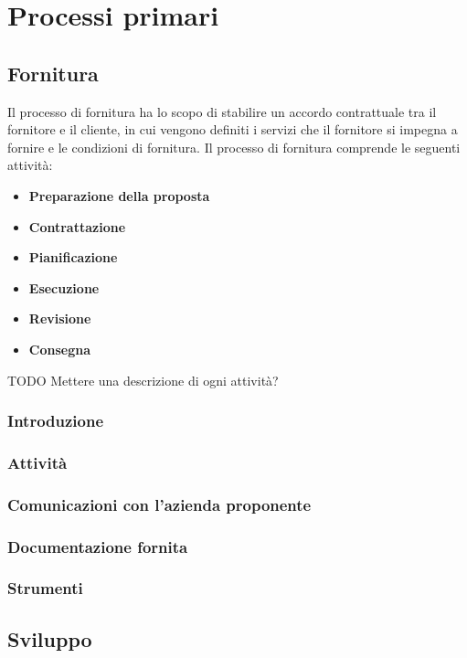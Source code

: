 \section{Processi primari}
\subsection{Fornitura}
Il processo di fornitura ha lo scopo di stabilire un accordo contrattuale tra il fornitore e il cliente, in cui vengono definiti i servizi che il fornitore si impegna a fornire e le condizioni di fornitura. 
Il processo di fornitura comprende le seguenti attività:
\begin{itemize}
	\item \textbf{Preparazione della proposta}
	\item \textbf{Contrattazione}
	\item \textbf{Pianificazione}
	\item \textbf{Esecuzione}
	\item \textbf{Revisione}
	\item \textbf{Consegna}
\end{itemize}
TODO Mettere una descrizione di ogni attività?

\subsubsection{Introduzione}
\subsubsection{Attività}
\subsubsection{Comunicazioni con l'azienda proponente}
\subsubsection{Documentazione fornita}
\subsubsection{Strumenti}
\subsection{Sviluppo}
